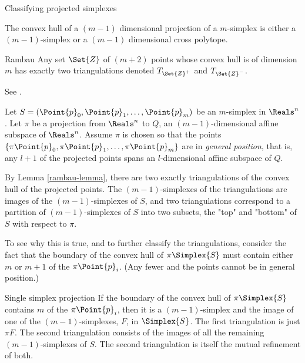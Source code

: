 \begin{plSection}{Classifying projected simplexes}
\label{sec:classifying}


The convex hull of a $(m-1)$ dimensional projection of a $m$-simplex
is either a $(m-1)$-simplex or a $(m-1)$ dimensional cross polytope.

\begin{plLemma}{Rambau}{}
\label{rambau-lemma}
Any set $\Set{Z}$ of $(m+2)$ points whose convex hull is of dimension $m$
has exactly two triangulations denoted $T_{\Set{Z}^+}$ and $T_{\Set{Z}^-}$.
\end{plLemma}

See .

Let $S=(\Point{p}_0, \Point{p}_1, \ldots , \Point{p}_m)$ be an $m$-simplex in $\Reals^{n}$.
Let $\pi$ be a projection from $\Reals^{n}$ to $Q$, an $(m-1)$-dimensional
affine subspace of $\Reals^{n}$.
Assume $\pi$ is chosen so that the points
$\{\pi \Point{p}_0, \pi \Point{p}_1, \ldots , \pi \Point{p}_m\}$ are in {\it general position},
that is, any $l+1$ of the projected points spans an $l$-dimensional
affine subspace of $Q$.

By Lemma \ref{rambau-lemma},
there are two exactly triangulations of the convex hull of the projected points.
The $(m-1)$-simplexes of the triangulations are images of the $(m-1)$-simplexes of $S$,
and two triangulations correspond to a partition of $(m-1)$-simplexes of $S$
into two subsets, the "top" and "bottom" of $S$ with respect to $\pi$.

To see why this is true, and to further classify the triangulations,
consider the fact that the boundary of the convex hull of $\pi \Simplex{S}$
must contain either $m$ or $m+1$ of the $\pi \Point{p}_i$.
(Any fewer and the points cannot be in general position.)

\begin{plTheorem}{Single simplex projection}{}
\label{one-simplex-case}
If the boundary of the convex hull of $\pi \Simplex{S}$
contains $m$ of the $\pi \Point{p}_i$,
then it is a $(m-1)$-simplex
and the image of one of the $(m-1)$-simplexes, $F$, in $\Simplex{S}$.
The first triangulation is just $\pi F$.
The second triangulation consists of the images of
all the remaining $(m-1)$-simplexes of $S$.
The second triangulation is itself the mutual refinement of both.
\end{plTheorem}


\end{plSection}
